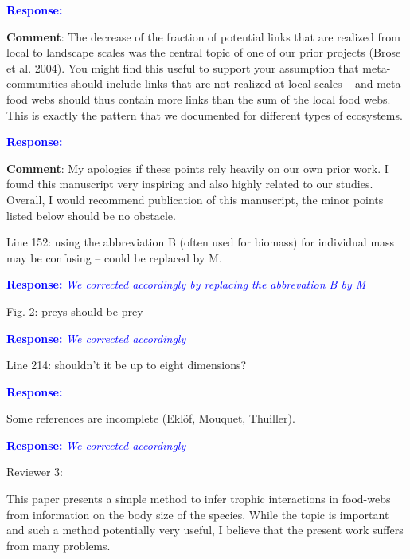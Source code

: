 \documentclass [12pt,onecolumn,twoside,openright]{report}
\begin{document}
\begin{onehalfspacing}
\medskip \textcolor{blue}{\textbf{Response:}} \textit{\textcolor{blue}{}}

\medskip \textbf{Comment}: The decrease of the fraction of
potential links that are realized from local to landscape scales was the central
topic of one of our prior projects (Brose et al. 2004). You might find this
useful to support your assumption that meta-communities should include links
that are not realized at local scales – and meta food webs should thus contain
more links than the sum of the local food webs. This is exactly the pattern that
we documented for different types of ecosystems.

\medskip \textcolor{blue}{\textbf{Response:}} \textit{\textcolor{blue}{}}

\medskip \textbf{Comment}: My apologies if these points rely
heavily on our own prior work. I found this manuscript very inspiring and also
highly related to our studies. Overall, I would recommend publication of this
manuscript, the minor points listed below should be no obstacle.

\medskip Line 152: using the abbreviation B (often used for
biomass) for individual mass may be confusing – could be replaced by M.

\textcolor{blue}{\textbf{Response:}} \textit{\textcolor{blue}{We corrected
accordingly by replacing the abbrevation B by M}}

\medskip Fig. 2: preys should be prey

\textcolor{blue}{\textbf{Response:}} \textit{\textcolor{blue}{We corrected
accordingly}}

\medskip Line 214: shouldn't it be up to eight dimensions?

\textcolor{blue}{\textbf{Response:}} \textit{\textcolor{blue}{}}

\medskip Some references are incomplete (Eklöf, Mouquet,
Thuiller). 

\textcolor{blue}{\textbf{Response:}} \textit{\textcolor{blue}{We corrected
accordingly}}



\begin{center} Reviewer 3: \end{center}

This paper presents a simple method to infer trophic interactions in food-webs
from information on the body size of the species. While the topic is important
and such a method potentially very useful, I believe that the present work
suffers from many problems.


\end{onehalfspacing}
\end{document}
